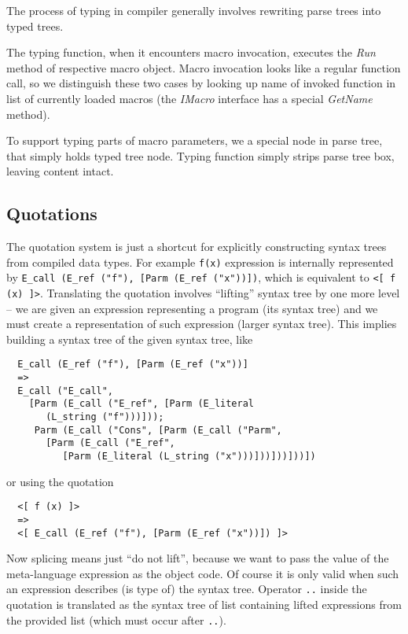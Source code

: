 \documentclass{llncs}
\begin{document}
The process of typing in compiler generally involves rewriting parse
trees into typed trees.

The typing function, when it encounters macro invocation, executes the
\emph{Run} method of respective macro object. Macro invocation looks
like a regular function call, so we distinguish these two cases by
looking up name of invoked function in list of currently loaded macros
(the \emph{IMacro} interface has a special \emph{GetName} method).

To support typing parts of macro parameters, we a special node in parse
tree, that simply holds typed tree node. Typing function simply strips
parse tree box, leaving content intact.


\subsection{Quotations}
The quotation system is just a shortcut for explicitly constructing syntax
trees from compiled data types.  For example \verb,f(x),
expression is internally represented by 
\verb.E_call (E_ref ("f"), [Parm (E_ref ("x"))]).,
which is equivalent to \verb,<[ f (x) ]>,. Translating the quotation involves
``lifting'' syntax tree by one more level -- we are given an expression 
representing a program (its syntax tree) and we must create a representation 
of such expression (larger syntax tree).
This implies building a syntax tree of the given syntax tree, like

\begin{verbatim}
  E_call (E_ref ("f"), [Parm (E_ref ("x"))] 
  =>
  E_call ("E_call", 
    [Parm (E_call ("E_ref", [Parm (E_literal 
       (L_string ("f")))]));
     Parm (E_call ("Cons", [Parm (E_call ("Parm", 
       [Parm (E_call ("E_ref", 
          [Parm (E_literal (L_string ("x")))]))]))]))])
\end{verbatim}

\noindent
or using the quotation

\begin{verbatim}
  <[ f (x) ]> 
  =>
  <[ E_call (E_ref ("f"), [Parm (E_ref ("x"))]) ]>
\end{verbatim}

Now splicing means just ``do not lift'', because we want to pass the value of 
the meta-language expression as the object code. Of course it is only valid 
when such an expression describes (is type of) the syntax tree. Operator \verb,.., 
inside the quotation is translated as the syntax tree of list containing lifted 
expressions from the provided list (which must occur after \verb,..,).
\end{document}
